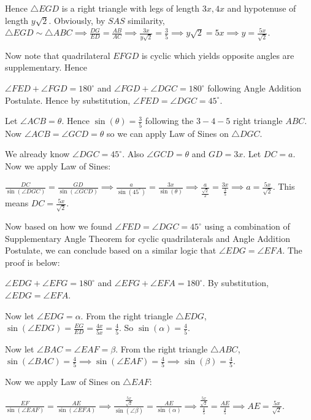 \begin{enumerate}
 Hence $\triangle EGD$ is a right triangle with legs of length $3x, 4x$ and hypotenuse of length $y\sqrt{2}$. Obviously, by $SAS$ similarity, $\triangle EGD \sim \triangle ABC \implies \frac{DG}{ED} = \frac{AB}{AC} \implies \frac{3x}{y\sqrt{2}} = \frac{3}{5} \implies y\sqrt{2} = 5x \implies y = \frac{5x}{\sqrt{2}}$.

 Now note that quadrilateral $EFGD$ is cyclic which yields opposite angles are supplementary. Hence

 $\angle FED + \angle FGD = 180^{\circ}$ and $\angle FGD + \angle DGC = 180^{\circ}$ following Angle Addition Postulate. Hence by substitution, $\angle FED = \angle DGC = 45^{\circ}$. 

 Let $\angle ACB = \theta$. Hence $\sin(\theta) = \frac{3}{5}$ following the $3-4-5$ right triangle $ABC$. Now $\angle ACB = \angle GCD = \theta$ so we can apply Law of Sines on $\triangle DGC$. 

 We already know $\angle DGC = 45^{\circ}$. Also $\angle GCD = \theta$ and $GD = 3x$. Let $DC = a$. Now we apply Law of Sines:

 $\frac{DC}{\sin(\angle DGC)} = \frac{GD}{\sin(\angle GCD)} \implies \frac{a}{\sin(45^{\circ})} = \frac{3x}{\sin(\theta)} \implies \frac{a}{\frac{\sqrt{2}}{2}} = \frac{3x}{\frac{3}{5}} \implies a = \frac{5x}{\sqrt{2}}$. This means $DC = \frac{5x}{\sqrt{2}}$. 

 Now based on how we found $\angle FED = \angle DGC = 45^{\circ}$ using a combination of Supplementary Angle Theorem for cyclic quadrilaterals and Angle Addition Postulate, we can conclude based on a similar logic that $\angle EDG = \angle EFA$. The proof is below:

 $\angle EDG + \angle EFG = 180^{\circ}$ and $\angle EFG + \angle EFA = 180^{\circ}$. By substitution, $\angle EDG = \angle EFA$. 

 Now let $\angle EDG = \alpha$. From the right triangle $\triangle EDG$, $\sin(\angle EDG) = \frac{EG}{ED} = \frac{4x}{5x} = \frac{4}{5}$. So $\sin(\alpha) = \frac{4}{5}$. 

 Now let $\angle BAC = \angle EAF = \beta$. From the right triangle $\triangle ABC$, $\sin(\angle BAC) = \frac{4}{5} \implies \sin(\angle EAF) = \frac{4}{5} \implies \sin(\beta) = \frac{4}{5}$. 

 Now we apply Law of Sines on $\triangle EAF$:

 $\frac{EF}{\sin(\angle EAF)} = \frac{AE}{\sin(\angle EFA)} \implies \frac{\frac{5x}{\sqrt{2}}}{\sin(\angle \beta)} = \frac{AE}{\sin(\alpha)} \implies \frac{\frac{5x}{\sqrt{2}}}{\frac{4}{5}} = \frac{AE}{\frac{4}{5}} \implies AE = \frac{5x}{\sqrt{2}}$.


\end{enumerate}
